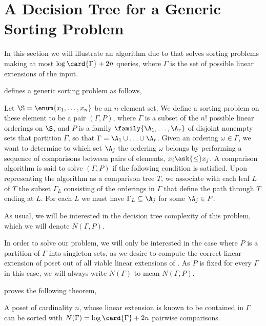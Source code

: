 \section{A Decision Tree for a Generic Sorting Problem}
\label{tree:xy:dt}

In this section we will illustrate an algorithm due to \citet*{fredman:1976}
that solves sorting problems making at most $\log\card{\Gamma} + 2n$ queries,
where $\Gamma$ is the set of possible linear extensions of the input.

\citet{fredman:1976} defines a generic sorting problem as follows,

\begin{problem}
Let $\S = \enum{x_1, \ldots, x_n}$ be an $n$-element set. We define a sorting
problem on these element to be a pair $(\Gamma, P)$, where $\Gamma$ is a
subset of the $n!$ possible linear orderings on $\S$, and
$P$ is a family $\family{\A_1, \ldots, \A_r}$ of disjoint nonempty sets that
partition $\Gamma$, so that $\Gamma = \A_1 \cup \ldots \cup \A_r$. Given an
ordering $\omega \in \Gamma$, we want to determine to which set $\A_j$ the
ordering $\omega$ belongs by performing a sequence of comparisons between
pairs of elements, $x_i \ask{\le} x_j$. A comparison algorithm is said to
solve $(\Gamma, P)$ if the following condition is satisfied. Upon representing
the algorithm as a comparison tree $T$, we associate with each leaf $L$ of $T$
the subset $\Gamma_L$ consisting of the orderings in $\Gamma$ that define the
path through $T$ ending at $L$. For each $L$ we must have $\Gamma_L \subseteq
\A_j$ for some $\A_j \in P$.
\end{problem}

As usual, we will be interested in the decision tree complexity of this
problem, which we will denote $N(\Gamma, P)$.

In order to solve our \XY problem, we will only be interested in the case
where $P$ is a partition of $\Gamma$ into singleton sets, as we desire to
compute the correct linear extension of poset \XY out of all viable linear
extensions of \XY. As $P$ is fixed for every $\Gamma$ in this case, we will
always write $N(\Gamma)$ to mean $N(\Gamma, P)$.

\citet{fredman:1976} proves the following theorem,

\begin{theorem}\label{theorem:fredman:1976}
A poset of cardinality $n$, whose linear extension is known to be contained in
$\Gamma$ can be sorted with $N(\Gamma) = \log \card{\Gamma} + 2n$ pairwise
comparisons.
\end{theorem}

